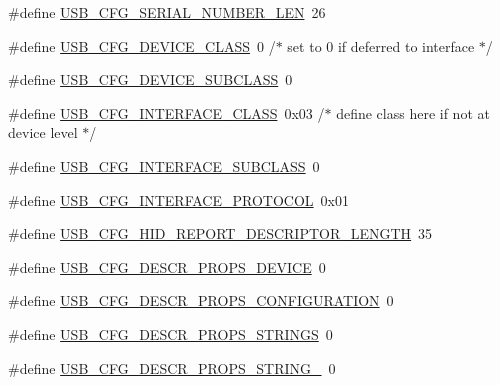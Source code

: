 \begin{DoxyCompactItemize}
\item 
\#define \hyperlink{mhvlib-_vusb-_keyboard_2vusb_2usbconfig_8h_a641423b56d832e5d8aff852390591aa0}{U\-S\-B\-\_\-\-C\-F\-G\-\_\-\-S\-E\-R\-I\-A\-L\-\_\-\-N\-U\-M\-B\-E\-R\-\_\-\-L\-E\-N}~26
\item 
\#define \hyperlink{mhvlib-_vusb-_keyboard_2vusb_2usbconfig_8h_a9ce4f96ad98b3db8205691e8bc723e55}{U\-S\-B\-\_\-\-C\-F\-G\-\_\-\-D\-E\-V\-I\-C\-E\-\_\-\-C\-L\-A\-S\-S}~0    /$\ast$ set to 0 if deferred to interface $\ast$/
\item 
\#define \hyperlink{mhvlib-_vusb-_keyboard_2vusb_2usbconfig_8h_a89e5ad66f8b835866e7d836c73bfd30d}{U\-S\-B\-\_\-\-C\-F\-G\-\_\-\-D\-E\-V\-I\-C\-E\-\_\-\-S\-U\-B\-C\-L\-A\-S\-S}~0
\item 
\#define \hyperlink{mhvlib-_vusb-_keyboard_2vusb_2usbconfig_8h_a34f6fe9486b66e8220a82a0eb87a7447}{U\-S\-B\-\_\-\-C\-F\-G\-\_\-\-I\-N\-T\-E\-R\-F\-A\-C\-E\-\_\-\-C\-L\-A\-S\-S}~0x03   /$\ast$ define class here if not at device level $\ast$/
\item 
\#define \hyperlink{mhvlib-_vusb-_keyboard_2vusb_2usbconfig_8h_ac643f27afa43062c19b8f0674b6be1b5}{U\-S\-B\-\_\-\-C\-F\-G\-\_\-\-I\-N\-T\-E\-R\-F\-A\-C\-E\-\_\-\-S\-U\-B\-C\-L\-A\-S\-S}~0
\item 
\#define \hyperlink{mhvlib-_vusb-_keyboard_2vusb_2usbconfig_8h_a8ddab89b764bfd88d024c7d9c9931de3}{U\-S\-B\-\_\-\-C\-F\-G\-\_\-\-I\-N\-T\-E\-R\-F\-A\-C\-E\-\_\-\-P\-R\-O\-T\-O\-C\-O\-L}~0x01
\item 
\#define \hyperlink{mhvlib-_vusb-_keyboard_2vusb_2usbconfig_8h_a47d9bef5c10a1b9ba917eca583d2abc9}{U\-S\-B\-\_\-\-C\-F\-G\-\_\-\-H\-I\-D\-\_\-\-R\-E\-P\-O\-R\-T\-\_\-\-D\-E\-S\-C\-R\-I\-P\-T\-O\-R\-\_\-\-L\-E\-N\-G\-T\-H}~35
\item 
\#define \hyperlink{mhvlib-_vusb-_keyboard_2vusb_2usbconfig_8h_aa916bf33f6f8f481a219d0a81b5b225e}{U\-S\-B\-\_\-\-C\-F\-G\-\_\-\-D\-E\-S\-C\-R\-\_\-\-P\-R\-O\-P\-S\-\_\-\-D\-E\-V\-I\-C\-E}~0
\item 
\#define \hyperlink{mhvlib-_vusb-_keyboard_2vusb_2usbconfig_8h_a8aae9f682ca9f91faae0453e4351a50b}{U\-S\-B\-\_\-\-C\-F\-G\-\_\-\-D\-E\-S\-C\-R\-\_\-\-P\-R\-O\-P\-S\-\_\-\-C\-O\-N\-F\-I\-G\-U\-R\-A\-T\-I\-O\-N}~0
\item 
\#define \hyperlink{mhvlib-_vusb-_keyboard_2vusb_2usbconfig_8h_a750fb6cc3e8eafaddae659af97f6f737}{U\-S\-B\-\_\-\-C\-F\-G\-\_\-\-D\-E\-S\-C\-R\-\_\-\-P\-R\-O\-P\-S\-\_\-\-S\-T\-R\-I\-N\-G\-S}~0
\item 
\#define \hyperlink{mhvlib-_vusb-_keyboard_2vusb_2usbconfig_8h_a9c0556a4c6c5a1ab8f6598aee8e5bf6a}{U\-S\-B\-\_\-\-C\-F\-G\-\_\-\-D\-E\-S\-C\-R\-\_\-\-P\-R\-O\-P\-S\-\_\-\-S\-T\-R\-I\-N\-G\-\_}~0

\end{DoxyCompactItemize}
